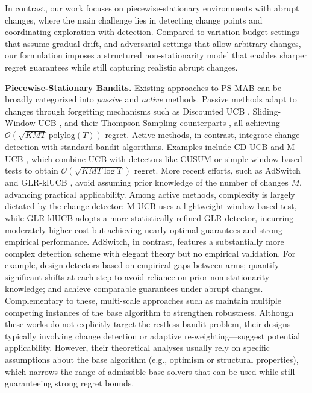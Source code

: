 \documentclass[twoside]{article}
\def\gO{{\mathcal{O}}}
\theoremstyle{plain}
\theoremstyle{definition}
\theoremstyle{remark}
\begin{document}
In contrast, our work focuses on piecewise-stationary environments with abrupt changes, where the main challenge lies in detecting change points and coordinating exploration with detection. Compared to variation-budget settings that assume gradual drift, and adversarial settings that allow arbitrary changes, our formulation imposes a structured non-stationarity model that enables sharper regret guarantees while still capturing realistic abrupt changes. 

\textbf{Piecewise-Stationary Bandits.} 
Existing approaches to PS-MAB can be broadly categorized into \emph{passive} and \emph{active} methods. 
Passive methods adapt to changes through forgetting mechanisms such as Discounted UCB \citep{kocsis2006discounted}, Sliding-Window UCB \citep{garivier2011upper}, and their Thompson Sampling counterparts \citep{raj2017taming,qi2023discounted}, all achieving $\gO(\sqrt{KMT}\,\mathrm{polylog}(T))$ regret. 
Active methods, in contrast, integrate change detection with standard bandit algorithms. 
Examples include CD-UCB \citep{liu2018change} and M-UCB \citep{cao2019nearly}, which combine UCB with detectors like CUSUM or simple window-based tests to obtain $\gO(\sqrt{KMT\log T})$ regret. 
More recent efforts, such as AdSwitch \citep{auer2019adaptively} and GLR-klUCB \citep{besson2022efficient}, avoid assuming prior knowledge of the number of changes $M$, advancing practical applicability. Among active methods, complexity is largely dictated by the change detector: M-UCB \citep{cao2019nearly} uses a lightweight window-based test, while GLR-klUCB adopts a more statistically refined GLR detector, incurring moderately higher cost but achieving nearly optimal guarantees and strong empirical performance. AdSwitch, in contrast, features a substantially more complex detection scheme with elegant theory but no empirical validation.
For example, \citet{manegueu2021generalized} design detectors based on empirical gaps between arms; 
\citet{suk2022tracking} quantify significant shifts at each step to avoid reliance on prior non-stationarity knowledge; 
and \citet{abbasi2023new} achieve comparable guarantees under abrupt changes. 
Complementary to these, multi-scale approaches such as \citet{pmlr-v134-wei21b} maintain multiple competing instances of the base algorithm to strengthen robustness. 
Although these works do not explicitly target the restless bandit problem, their designs—typically involving change detection or adaptive re-weighting—suggest potential applicability. 
However, their theoretical analyses usually rely on specific assumptions about the base algorithm (e.g., optimism or structural properties), 
which narrows the range of admissible base solvers that can be used while still guaranteeing strong regret bounds.
\end{document}
